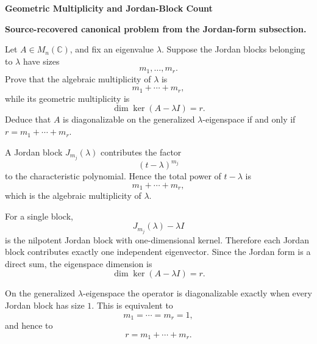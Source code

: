 \begin{problem}[CP-I-0034]
\label{prob:cp-i-0034}
\textbf{Geometric Multiplicity and Jordan-Block Count}

\textbf{Source-recovered canonical problem from the Jordan-form subsection.}

\hspace*{1.5em}Let \(A\in M_n(\mathbb C)\), and fix an eigenvalue \(\lambda\).
Suppose the Jordan blocks belonging to \(\lambda\) have sizes
\[
m_1,\dots,m_r.
\]
Prove that the algebraic multiplicity of \(\lambda\) is
\[
m_1+\cdots+m_r,
\]
while its geometric multiplicity is
\[
\dim\ker(A-\lambda I)=r.
\]
Deduce that \(A\) is diagonalizable on the generalized \(\lambda\)-eigenspace if and only if
\(r=m_1+\cdots+m_r\).
\end{problem}

\begin{solution}
A Jordan block \(J_{m_j}(\lambda)\) contributes the factor
\[
(t-\lambda)^{m_j}
\]
to the characteristic polynomial. Hence the total power of \(t-\lambda\) is
\[
m_1+\cdots+m_r,
\]
which is the algebraic multiplicity of \(\lambda\).

For a single block,
\[
J_{m_j}(\lambda)-\lambda I
\]
is the nilpotent Jordan block with one-dimensional kernel. Therefore each Jordan block contributes
exactly one independent eigenvector. Since the Jordan form is a direct sum, the eigenspace
dimension is
\[
\dim\ker(A-\lambda I)=r.
\]

On the generalized \(\lambda\)-eigenspace the operator is diagonalizable exactly when every
Jordan block has size \(1\). This is equivalent to
\[
m_1=\cdots=m_r=1,
\]
and hence to
\[
r=m_1+\cdots+m_r.
\]
\end{solution}

